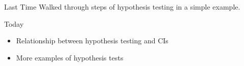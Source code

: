 \documentclass[handout]{beamer}
\date{Lecture 22}
\begin{document}
 





\begin{frame}[plain]
	\titlepage 
	

\end{frame} 

\begin{frame}
\begin{block}
	{Last Time}
	Walked through steps of hypothesis testing in a simple example.
\end{block}
\begin{alertblock}
	{Today}
	\begin{itemize}
		\item Relationship between hypothesis testing and CIs
		\item More examples of hypothesis tests
	\end{itemize}
\end{alertblock}
\end{frame}
\end{document}

